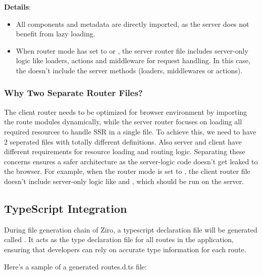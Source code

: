 \textbf{Details}:
\begin{itemize}
  \item All components and metadata are directly imported, as the server does not benefit from lazy loading.
  \item When router mode has set to  or , the server router file includes server-only logic like loaders, actions and middleware for request handling. In this case, the  doesn't include the server methods (loaders, middlewares or actions).
\end{itemize}

\subsubsection{Why Two Separate Router Files?}
The client router needs to be optimized for browser environment by importing the route modules dynamically, while the server router focuses on loading all required resources to handle SSR in a single file. To achieve this, we need to have 2 seperated files with totally different definitions. Also server and client have different requirements for resource loading and routing logic. Separating these concerns ensures a safer architecture as the server-logic code doesn't get leaked to the browser. For example, when the router mode is set to , the client router file doesn't include server-only logic like  and , which should be run on the server.

\subsection{TypeScript Integration}
During file generation chain of Ziro, a typescript declaration file will be generated called . It acts as the type declaration file for all routes in the application, ensuring that developers can rely on accurate type information for each route.

Here’s a sample of a generated routes.d.ts file:

